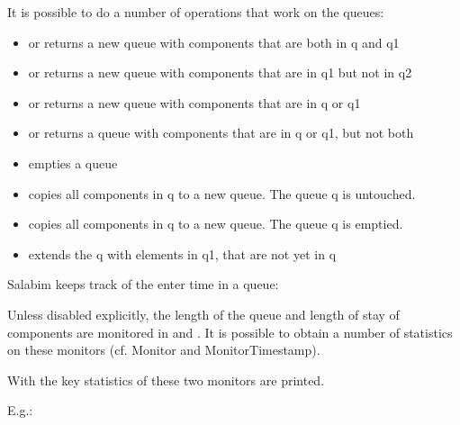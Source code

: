 \documentclass[letterpaper,10pt,english]{sphinxmanual}
\begin{document}
It is possible to do a number of operations that work on the queues:
\begin{itemize}
\item {} 
 or  returns a new queue with components that are both in q and q1

\item {} 
 or  returns a new queue with components that are in q1 but not in q2

\item {} 
 or  returns a new queue with components that are in q or q1

\item {} 
 or  returns a queue with components that are in q or q1, but not both

\item {} 
 empties a queue

\item {} 
 copies all components in q to a new queue. The queue q is untouched.

\item {} 
 copies all components in q to a new queue. The queue q is emptied.

\item {} 
 extends the q with elements in q1, that are not yet in q

\end{itemize}

Salabim keeps track of the enter time in a queue: 

Unless disabled explicitly, the length of the queue and length of stay of components are monitored in
 and . It is possible to obtain a number of statistics on these monitors (cf. Monitor and MonitorTimestamp).

With  the key statistics of these two monitors are printed.

E.g.:
\end{document}
